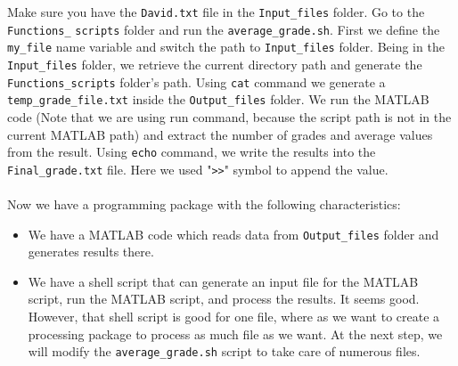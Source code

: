 Make sure you have the \texttt{David.txt} file in the \texttt{Input\_files} folder. Go to the \texttt{Functions\_} \texttt{scripts} folder and run the \texttt{average\_grade.sh}.  First we define the \texttt{my\_file} name variable and switch the path to \texttt{Input\_files} folder. Being in the \texttt{Input\_files} folder, we retrieve the current directory path and generate the \texttt{Functions\_scripts} folder's path. Using \texttt{cat} command we generate a \texttt{temp\_grade\_file.txt} inside the \texttt{Output\_files} folder. We run the MATLAB code (Note that we are using run command, because the script path is not in the current MATLAB path) and extract the number of grades and average values from the result. Using \texttt{echo} command, we write the results into the \texttt{Final\_grade.txt} file. Here we used "\texttt{>>}" symbol to append the value. \\
\\
Now we have a programming package with the following characteristics:

\begin{itemize}
\item{We have a MATLAB code which reads data from \texttt{Output\_files} folder and generates results there.}
\item{We have a shell script that can generate an input file for the MATLAB script, run the MATLAB script, and process the results. It seems good. However, that shell script is good for one file, where as we want to create a processing package to process as much file as we want. At the next step, we will modify the  \texttt{average\_grade.sh} script to take care of numerous files. \\}
\end{itemize}



